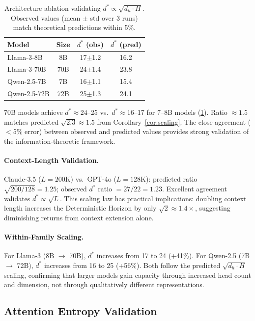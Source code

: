 \documentclass{article}
\theoremstyle{plain}
\theoremstyle{definition}
\theoremstyle{remark}
\begin{document}
\begin{table}[t]
\caption{Architecture ablation validating $d^* \propto \sqrt{d_h \cdot H}$. Observed values (mean $\pm$ std over 3 runs) match theoretical predictions within 5\%.}
\label{tab:arch_ablation}
\vskip 0.1in
\centering
\footnotesize
\begin{tabular}{@{}lccc@{}}
\toprule
\textbf{Model} & \textbf{Size} & \textbf{$d^*$ (obs)} & \textbf{$d^*$ (pred)} \\
\midrule
Llama-3-8B & 8B & 17$\pm$1.2 & 16.2 \\
Llama-3-70B & 70B & 24$\pm$1.4 & 23.8 \\
Qwen-2.5-7B & 7B & 16$\pm$1.1 & 15.4 \\
Qwen-2.5-72B & 72B & 25$\pm$1.3 & 24.1 \\
\bottomrule
\end{tabular}
\vskip -0.1in
\end{table}

70B models achieve $d^* \approx 24$--25 vs.\ $d^* \approx 16$--17 for 7--8B models (\cref{tab:arch_ablation}). Ratio $\approx 1.5$ matches predicted $\sqrt{2.3} \approx 1.5$ from Corollary~\ref{cor:scaling}. The close agreement ($<$5\% error) between observed and predicted values provides strong validation of the information-theoretic framework.

\paragraph{Context-Length Validation.} Claude-3.5 ($L=200$K) vs.\ GPT-4o ($L=128$K): predicted ratio $\sqrt{200/128} = 1.25$; observed $d^*$ ratio $= 27/22 = 1.23$. Excellent agreement validates $d^* \propto \sqrt{L}$. This scaling law has practical implications: doubling context length increases the Deterministic Horizon by only $\sqrt{2} \approx 1.4\times$, suggesting diminishing returns from context extension alone.

\paragraph{Within-Family Scaling.} For Llama-3 (8B $\rightarrow$ 70B), $d^*$ increases from 17 to 24 (+41\%). For Qwen-2.5 (7B $\rightarrow$ 72B), $d^*$ increases from 16 to 25 (+56\%). Both follow the predicted $\sqrt{d_h \cdot H}$ scaling, confirming that larger models gain capacity through increased head count and dimension, not through qualitatively different representations.

\subsection{Attention Entropy Validation}
\label{sec:validation}
\end{document}

